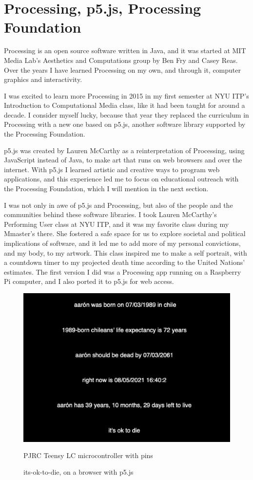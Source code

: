 \section{Processing, p5.js, Processing Foundation}

Processing is an open source software written in Java, and it was started at MIT Media Lab's Aesthetics and Computations group by Ben Fry and Casey Reas. Over the years I have learned Processing on my own, and through it, computer graphics and interactivity.

I was excited to learn more Processing in 2015 in my first semester at \acrshort{NYU} \acrshort{ITP}'s Introduction to Computational Media class, like it had been taught for around a decade. I consider myself lucky, because that year they replaced the curriculum in Processing with a new one based on p5.js, another software library supported by the Processing Foundation.

p5.js was created by Lauren McCarthy as a reinterpretation of Processing, using JavaScript instead of Java, to make art that runs on web browsers and over the internet. With p5.js I learned artistic and creative ways to program web applications, and this experience led me to focus on educational outreach with the Processing Foundation, which I will mention in the next section.

I was not only in awe of p5.js and Processing, but also of the people and the communities behind these software libraries. I took Lauren McCarthy's Performing User class \cite{website-nyu-itp-lauren-mccarthy-performing-user} at \acrshort{NYU} \acrshort{ITP}, and it was my favorite class during my Mmaster's there. She fostered a safe space for us to explore societal and political implications of software, and it led me to add more of my personal convictions, and my body, to my artwork. This class inspired me to make a self portrait, with a countdown timer to my projected death time according to the United Nations' estimates. The first version I did was a Processing app running on a Raspberry Pi computer, and I also ported it to p5.js for web access.

\begin{figure}[ht]
  \centering
  \includegraphics[width=0.75\linewidth,height=0.35\textheight,keepaspectratio]{images/its-ok-to-die-p5js.jpg}
  \caption{PJRC Teensy LC microcontroller with pins}
  \caption*{its-ok-to-die, on a browser with p5.js}
  \label{fig:its-ok-to-die-p5js}
\end{figure}

